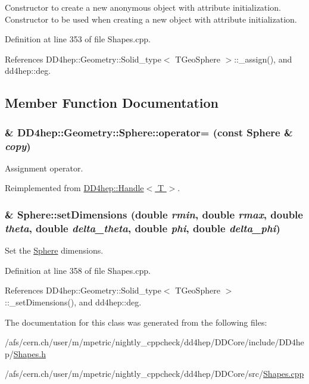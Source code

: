 Constructor to create a new anonymous object with attribute initialization. Constructor to be used when creating a new object with attribute initialization. 

Definition at line 353 of file Shapes.cpp.

References DD4hep::Geometry::Solid\_\-type$<$ TGeoSphere $>$::\_\-assign(), and dd4hep::deg.

\subsection{Member Function Documentation}
\hypertarget{class_d_d4hep_1_1_geometry_1_1_sphere_a23b08fc1a799d20f1a66e58611c1084d}{
\subsubsection[{operator=}]{\& DD4hep::Geometry::Sphere::operator= (const {\bf Sphere} \& {\em copy})}}
\label{class_d_d4hep_1_1_geometry_1_1_sphere_a23b08fc1a799d20f1a66e58611c1084d}


Assignment operator. 

Reimplemented from \hyperlink{class_d_d4hep_1_1_handle_a9bbf8f498df42e81ad26fb00233505a6}{DD4hep::Handle$<$ T $>$}.\hypertarget{class_d_d4hep_1_1_geometry_1_1_sphere_a0c80e5f5655ed0211c769d9193461d79}{
\subsubsection[{setDimensions}]{ \& Sphere::setDimensions (double {\em rmin}, \/  double {\em rmax}, \/  double {\em theta}, \/  double {\em delta\_\-theta}, \/  double {\em phi}, \/  double {\em delta\_\-phi})}}
\label{class_d_d4hep_1_1_geometry_1_1_sphere_a0c80e5f5655ed0211c769d9193461d79}


Set the \hyperlink{class_d_d4hep_1_1_geometry_1_1_sphere}{Sphere} dimensions. 

Definition at line 358 of file Shapes.cpp.

References DD4hep::Geometry::Solid\_\-type$<$ TGeoSphere $>$::\_\-setDimensions(), and dd4hep::deg.

The documentation for this class was generated from the following files:\begin{DoxyCompactItemize}
\item 
/afs/cern.ch/user/m/mpetric/nightly\_\-cppcheck/dd4hep/DDCore/include/DD4hep/\hyperlink{_shapes_8h}{Shapes.h}\item 
/afs/cern.ch/user/m/mpetric/nightly\_\-cppcheck/dd4hep/DDCore/src/\hyperlink{_shapes_8cpp}{Shapes.cpp}\end{DoxyCompactItemize}
